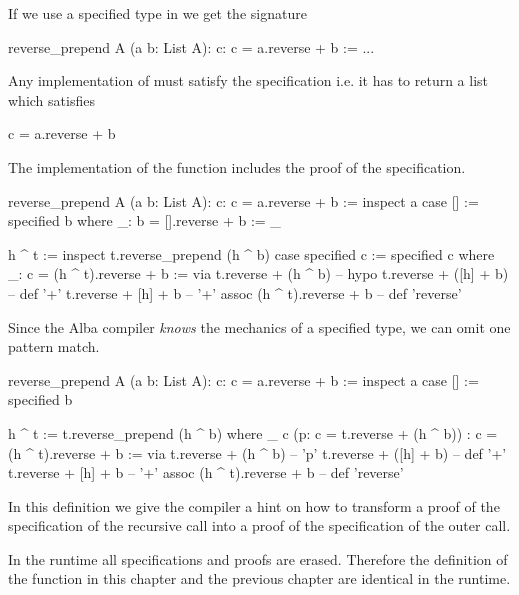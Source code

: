 If we use a specified type in  we get the signature
\begin{alba}
  reverse_prepend A (a b: List A): {c: c = a.reverse + b} :=
    ...
\end{alba}

Any implementation of  must satisfy the specification
i.e. it has to return a list  which satisfies
\begin{alba}
  c = a.reverse + b
\end{alba}


The implementation of the function includes the proof of the specification.

\begin{alba}
  reverse_prepend A (a b: List A): {c: c = a.reverse + b} :=
    inspect a case
      [] :=
        specified b where
          _: b = [].reverse + b := _

      h ^ t :=
        inspect t.reverse_prepend (h ^ b) case
          specified c :=
            specified c where
              _: c = (h ^ t).reverse + b :=
                via t.reverse + (h ^ b)      -- hypo
                    t.reverse + ([h] + b)    -- def '+'
                    t.reverse + [h] + b      -- '+' assoc
                    (h ^ t).reverse + b      -- def 'reverse'
\end{alba}


Since the Alba compiler \emph{knows} the mechanics of a specified type, we can
omit one pattern match.

\begin{alba}
  reverse_prepend A (a b: List A): {c: c = a.reverse + b} :=
    inspect a case
      [] :=
        specified b

      h ^ t :=
        t.reverse_prepend (h ^ b) where
          _ c (p: c = t.reverse + (h ^ b))
            : c = (h ^ t).reverse + b :=
             via t.reverse + (h ^ b)      -- 'p'
                 t.reverse + ([h] + b)    -- def '+'
                 t.reverse + [h] + b      -- '+' assoc
                 (h ^ t).reverse + b      -- def 'reverse'
\end{alba}

In this definition we give the compiler a hint on how to transform a proof of
the specification of the recursive call into a proof of the specification of
the outer call.

In the runtime all specifications and proofs are erased. Therefore the
definition of the function  in this chapter and the
previous chapter are identical in the runtime.








